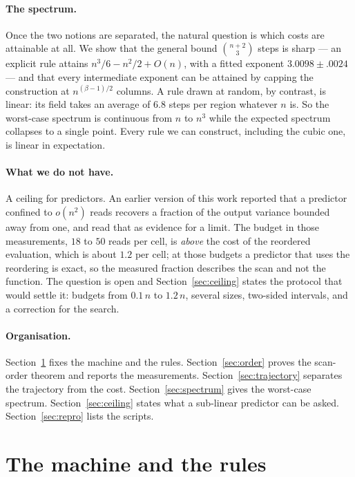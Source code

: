 \documentclass[11pt]{article}
\begin{document}
\paragraph{The spectrum.} Once the two notions are separated, the natural question is
which costs are attainable at all. We show that the general bound $\binom{n+2}{3}$ steps
is sharp --- an explicit rule attains $n^3/6-n^2/2+O(n)$, with a fitted exponent
$3.0098\pm.0024$ --- and that every intermediate exponent can be attained by capping the
construction at $n^{(\beta-1)/2}$ columns. A rule drawn at random, by contrast, is linear:
its field takes an average of $6.8$ steps per region whatever $n$ is. So the worst-case
spectrum is continuous from $n$ to $n^3$ while the expected spectrum collapses to a single
point. Every rule we can construct, including the cubic one, is linear in expectation.

\paragraph{What we do not have.} A ceiling for predictors. An earlier version of this work
reported that a predictor confined to $o(n^2)$ reads recovers a fraction of the output
variance bounded away from one, and read that as evidence for a limit. The budget in those
measurements, $18$ to $50$ reads per cell, is \emph{above} the cost of the reordered
evaluation, which is about $1.2$ per cell; at those budgets a predictor that uses the reordering is
exact, so the measured fraction describes the scan and not the function. The question is
open and Section~\ref{sec:ceiling} states the protocol that would settle it: budgets from
$0.1\,n$ to $1.2\,n$, several sizes, two-sided intervals, and a correction for the search.

\paragraph{Organisation.} Section~\ref{sec:machine} fixes the machine and the rules.
Section~\ref{sec:order} proves the scan-order theorem and reports the measurements.
Section~\ref{sec:trajectory} separates the trajectory from the cost.
Section~\ref{sec:spectrum} gives the worst-case spectrum.
Section~\ref{sec:ceiling} states what a sub-linear predictor can be asked.
Section~\ref{sec:repro} lists the scripts.

\section{The machine and the rules}\label{sec:machine}
\end{document}
